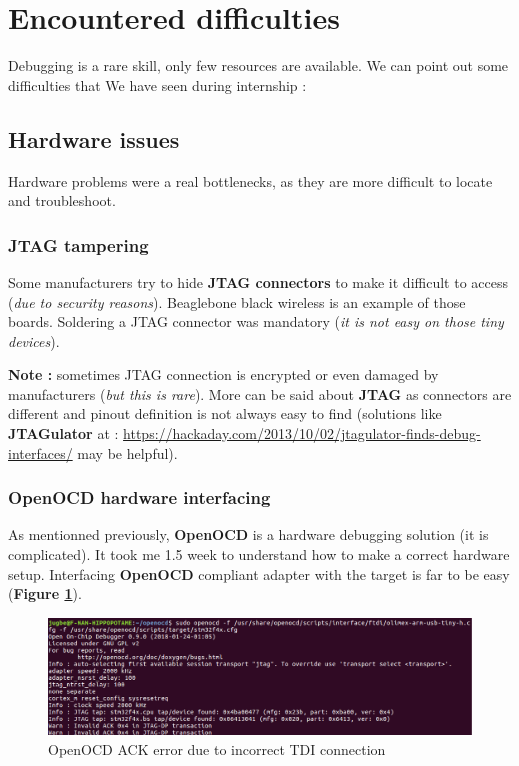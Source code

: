 \section{Encountered difficulties}
Debugging is a rare skill, only few resources are available. We can point out some difficulties that We have seen during internship :

\subsection{Hardware issues}
Hardware problems were a real bottlenecks, as they are more difficult to locate and troubleshoot.
\subsubsection{JTAG tampering}
Some manufacturers try to hide \textbf{JTAG connectors} to make it difficult to access (\textit{due to security reasons}). Beaglebone black wireless is an example of those boards. Soldering a JTAG connector was mandatory (\textit{it is not easy on those tiny devices}).

\textbf{\color{orange}Note : } sometimes JTAG connection is encrypted or even damaged by manufacturers (\textit{but this is rare}). 
More can be said about \textbf{JTAG} as connectors are different and pinout definition is not always easy to find (solutions like \textbf{JTAGulator} at : {\color{blue}\url{https://hackaday.com/2013/10/02/jtagulator-finds-debug-interfaces/}} may be helpful).
\subsubsection{OpenOCD hardware interfacing}
As mentionned previously, \textbf{OpenOCD} is a hardware debugging solution (it is complicated). It took me 1.5 week to understand how to make a correct hardware setup. Interfacing \textbf{OpenOCD} compliant adapter with the target is far to be easy (\textbf{Figure \ref{OpenOCD ACK error due to incorrect TDI connection}}).


\begin{figure}[H]
		\centering
        \includegraphics[scale=0.40]{img/issues/tdi-not-connected-openocd.png}
        \caption{OpenOCD ACK error due to incorrect TDI connection}
        \label{OpenOCD ACK error due to incorrect TDI connection}
    \end{figure}


